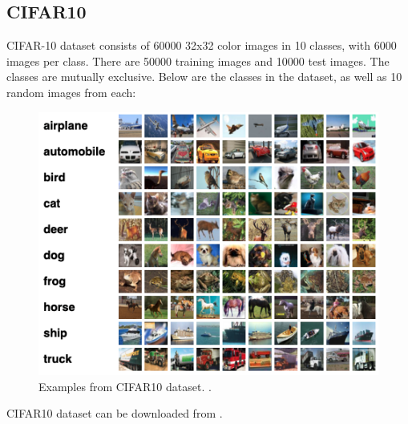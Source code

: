 \documentclass[12pt,a4paper,openany]{book}
\begin{document}
\subsection*{CIFAR10}
\noindent CIFAR-10 dataset consists of 60000 32x32 color images in 10 classes, with 6000 images per class. There are 50000 training images and 10000 test images. The classes are mutually exclusive. Below are the classes in the dataset, as well as 10 random images from each:
\begin{figure}[H]
    \centering
    \includegraphics[scale=0.6]{figs/cifar10_dataset.png}
    \caption{Examples from CIFAR10 dataset. \cite{cifar10_data}.}
\end{figure}
\noindent CIFAR10 dataset can be downloaded from \cite{cifar10_data}.
\end{document}
